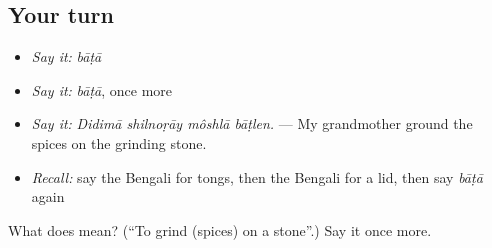 \subsection*{Your turn}
\begin{itemize}
\raggedright
  \item \emph{Say it:} \emph{bāṭā}
  \item \emph{Say it:} \emph{bāṭā}, once more
  \item \emph{Say it:} \emph{Didimā shilnoṛāy môshlā bāṭlen.} — My grandmother ground the spices on the grinding stone.
  \item \emph{Recall:} say the Bengali for tongs, then the Bengali for a lid, then say \emph{bāṭā} again
\end{itemize}

\begin{tcolorbox}[breakable,colback=teal!4,colframe=teal!35!black,title={Before you move on}]
What does  mean? (\textquotedblleft{}To grind (spices) on a stone\textquotedblright{}.) Say it once more.
\end{tcolorbox}
